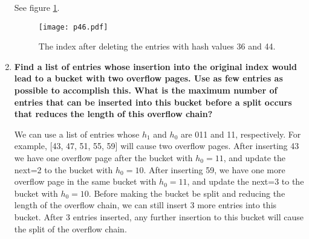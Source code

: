 \begin{enumerate}
See figure \ref{p46}.

\begin{figure}[h]
\begin{center}
\texttt{[image: p46.pdf]}
\end{center}
\caption{The index after deleting the entries with hash values 36 and 44.}
\label{p46}
\end{figure}

\item {\bf Find a list of entries whose insertion into the original index would lead to a bucket with two overflow pages. Use as few entries as possible to accomplish this. What is the maximum number of entries that can be inserted into this bucket before a split occurs that reduces the length of this overflow chain?}

We can use a list of entries whose $h_1$ and $h_0$ are 011 and 11, respectively.  For example, [43, 47, 51, 55, 59] will cause two overflow pages.  After inserting 43 we have one overflow page after the bucket with $h_0 = 11$, and update the next=2 to the bucket with $h_0=10$.  After inserting 59, we have one more overflow page in the same bucket with $h_0=11$, and update the next=3 to the bucket with $h_0=10$.  Before making the bucket be split and reducing the length of the overflow chain, we can still insert 3 more entries into this bucket.  After 3 entries inserted, any further insertion to this bucket will cause the split of the overflow chain.

\end{enumerate}



